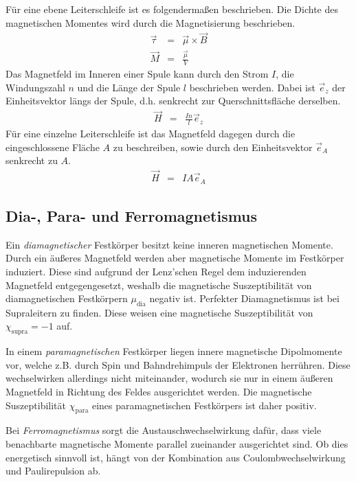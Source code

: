 \documentclass[12pt,a4paper]{scrartcl}
\numberwithin{equation}{section} %
\renewcommand{\[}{} %
\renewcommand{\]}{\noindent} %
\begin{document}
Für eine ebene Leiterschleife ist es folgendermaßen beschrieben. \cite{Jackson}
Die Dichte des magnetischen Momentes wird durch die Magnetisierung beschrieben.
\begin{eqnarray}
    \vec \tau &=& \vec \mu \times \vec B \\
    \vec M &=& \frac{\vec \mu}{V}
\end{eqnarray}
Das Magnetfeld im Inneren einer Spule kann durch den Strom \(I\), die 
Windungszahl \(n\) und die Länge der Spule \(l\) beschrieben werden. Dabei ist \(\vec e_z\) der Einheitsvektor längs der Spule, d.h. senkrecht zur Querschnittsfläche derselben. \cite{Jackson}
\begin{eqnarray}
    \vec H &=& \frac{In}{l} \vec e_z \label{H(I)}
\end{eqnarray}
Für eine einzelne Leiterschleife ist das Magnetfeld dagegen durch die eingeschlossene Fläche \(A\) zu beschreiben, sowie durch den Einheitsvektor \(\vec e_A\) senkrecht zu \(A\).
\begin{eqnarray}
    \vec H &=& IA \vec e_A
\end{eqnarray}

\hypertarget{dia--para--und-ferromagnetismus}{%
\subsection{Dia-, Para- und Ferromagnetismus}\label{dia--para--und-ferromagnetismus}}
Ein \emph{diamagnetischer} Festkörper besitzt keine inneren magnetischen Momente. Durch ein äußeres Magnetfeld werden aber magnetische Momente im Festkörper induziert. Diese sind aufgrund der Lenz'schen Regel dem induzierenden Magnetfeld entgegengesetzt, weshalb die magnetische Suszeptibilität von diamagnetischen Festkörpern \(\mu_\mathrm{dia}\)
negativ ist. Perfekter Diamagnetismus ist bei Supraleitern zu finden. Diese weisen eine magnetische Suszeptibilität von \(\chi_\mathrm{supra} = -1\) auf.

In einem \emph{paramagnetischen} Festkörper liegen innere magnetische Dipolmomente vor, welche z.B. durch Spin und Bahndrehimpuls der Elektronen herrühren. Diese wechselwirken allerdings nicht miteinander, wodurch sie nur in einem äußeren Magnetfeld in Richtung des Feldes ausgerichtet werden. Die magnetische Suszeptibilität \(\chi_\mathrm{para}\) eines paramagnetischen Festkörpers ist daher positiv.

Bei \emph{Ferromagnetismus} sorgt die Austauschwechselwirkung dafür, dass viele benachbarte magnetische Momente parallel zueinander ausgerichtet sind. Ob dies energetisch sinnvoll ist, hängt von der Kombination aus Coulombwechselwirkung und Paulirepulsion ab.
\end{document}
